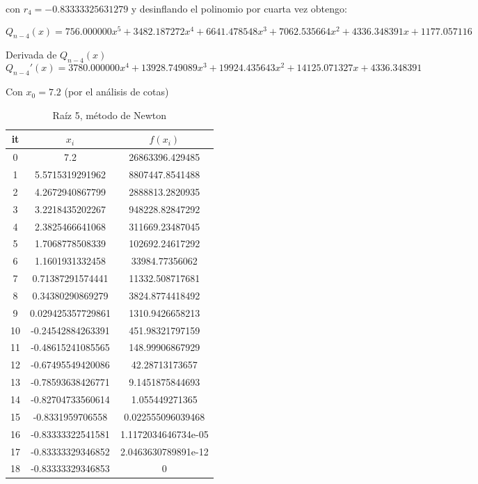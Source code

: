 \documentclass{article} %
\begin{document}
con $r_4 = -0.83333325631279$ y desinflando el polinomio por cuarta vez obtengo:

\begin{equation*}
    Q_{n-4}(x) = 756.000000x^5 + 3482.187272x^4 + 6641.478548x^3 + 7062.535664x^2 + 4336.348391x + 1177.057116
\end{equation*}

Derivada de $Q_{n-4}(x)$
\begin{equation*}
    Q_{n-4}'(x) = 3780.000000x^4 + 13928.749089x^3 + 19924.435643x^2 + 14125.071327x + 4336.348391
\end{equation*}

Con $x_0 = 7.2$ (por el análisis de cotas) 

\begin{table}[H]
\centering
\begin{tabular}{|c|c|c|}
\hline
it & $x_i$ & $f(x_i)$\\
\hline
0 & 7.2 & 26863396.429485\\
1 & 5.5715319291962 & 8807447.8541488\\
2 & 4.2672940867799 & 2888813.2820935\\
3 & 3.2218435202267 & 948228.82847292\\
4 & 2.3825466641068 & 311669.23487045\\
5 & 1.7068778508339 & 102692.24617292\\
6 & 1.1601931332458 & 33984.77356062\\
7 & 0.71387291574441 & 11332.508717681\\
8 & 0.34380290869279 & 3824.8774418492\\
9 & 0.029425357729861 & 1310.9426658213\\
10 & -0.24542884263391 & 451.98321797159\\
11 & -0.48615241085565 & 148.99906867929\\
12 & -0.67495549420086 & 42.28713173657\\
13 & -0.78593638426771 & 9.1451875844693\\
14 & -0.82704733560614 & 1.055449271365\\
15 & -0.8331959706558 & 0.022555096039468\\
16 & -0.83333322541581 & 1.1172034646734e-05\\
17 & -0.83333329346852 & 2.0463630789891e-12\\
18 & -0.83333329346853 & 0\\
\hline
\end{tabular}
\caption{Raíz 5, método de Newton}
\end{table}
\end{document}
